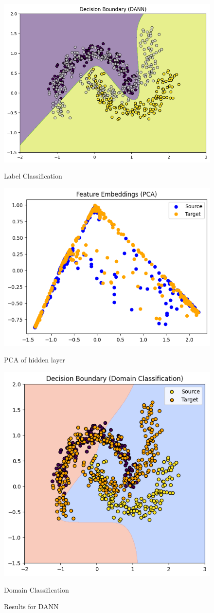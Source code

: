 \documentclass{article}
\begin{document}
\begin{figure}
\centering
\begin{minipage}{0.32\linewidth}
\centering
\includegraphics[width=0.7\linewidth]{DANN/label_decision_dann.png}
\caption{\small Label Classification}
\label{fig:label_decision_dann}
\end{minipage}
\hfill
\begin{minipage}{0.32\linewidth}
\centering
\includegraphics[width=0.7\linewidth]{DANN/feature_dann.png}
\caption{\small PCA of hidden layer}
\label{fig:feature_dann}
\end{minipage}
\hfill
\begin{minipage}{0.32\linewidth}
\centering
\includegraphics[width=0.55\linewidth]{DANN/domain_decision_dann.png}
\caption{\small Domain Classification}
\label{fig:domain_decision_dann}
\end{minipage}
\caption{\small Results for DANN}
\label{fig:dann}
\end{figure}
\end{document}
